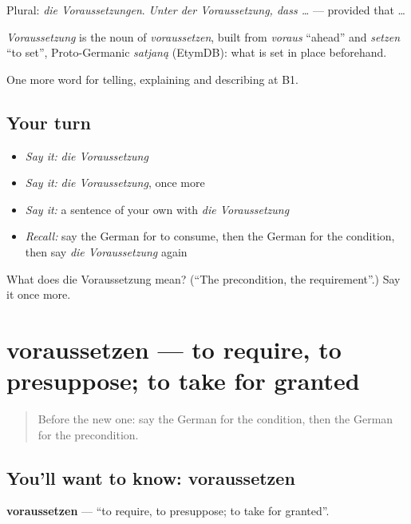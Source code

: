 Plural: \emph{die Voraussetzungen}. \emph{Unter der Voraussetzung, dass …} — provided that …

\begin{cousinweb}
\emph{Voraussetzung} is the noun of \emph{voraussetzen}, built from \emph{voraus} \textquotedblleft{}ahead\textquotedblright{} and \emph{setzen} \textquotedblleft{}to set\textquotedblright{}, Proto-Germanic \emph{satjaną} (EtymDB): what is set in place beforehand.
\end{cousinweb}

\begin{grammarlens}[title={What you've built}]
One more word for telling, explaining and describing at B1.
\end{grammarlens}

\subsection*{Your turn}
\begin{itemize}
\raggedright
  \item \emph{Say it:} \emph{die Voraussetzung}
  \item \emph{Say it:} \emph{die Voraussetzung}, once more
  \item \emph{Say it:} a sentence of your own with \emph{die Voraussetzung}
  \item \emph{Recall:} say the German for to consume, then the German for the condition, then say \emph{die Voraussetzung} again
\end{itemize}

\begin{tcolorbox}[breakable,colback=teal!4,colframe=teal!35!black,title={Before you move on}]
What does die Voraussetzung mean? (\textquotedblleft{}The precondition, the requirement\textquotedblright{}.) Say it once more.
\end{tcolorbox}
\section[voraussetzen]{voraussetzen — to require, to presuppose; to take for granted}

\label{lesson:GE-C364-voraussetzen}



\begin{quote}
Before the new one: say the German for the condition, then the German for the precondition.
\end{quote}

\subsection*{You'll want to know: voraussetzen}
\textbf{voraussetzen} — \textquotedblleft{}to require, to presuppose; to take for granted\textquotedblright{}.

